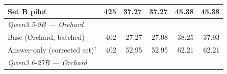\begin{table}[t]
{\begin{tabular}{lrrrrr}
Set B pilot & 425 & 37.27 & 37.27 & 45.38 & 45.38 \\
\midrule
\multicolumn{6}{l}{\textit{Qwen3.5-9B --- Orchard}} \\
Base (Orchard, batched) & 402 & 27.27 & 27.08 & 38.25 & 37.93 \\
Answer-only (corrected set)$^{\dagger}$ & 402 & 52.95 & 52.95 & 62.21 & 62.21 \\
\midrule
\multicolumn{6}{l}{\textit{Qwen3.6-27B --- Orchard}} \\

\end{tabular}}
\end{table}

